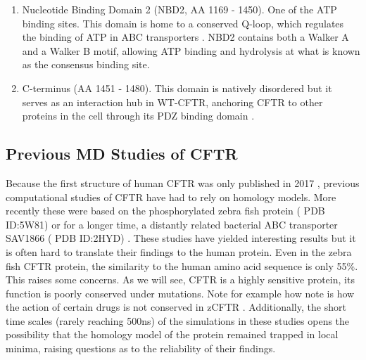 \begin{enumerate}
	\item Nucleotide Binding Domain 2 (NBD2, AA 1169 - 1450). One of the ATP binding sites. This domain is home to a conserved Q-loop, which regulates the binding of ATP in ABC transporters \cite{ivey2020, zolnerciks2014, dong2015}. NBD2 contains both a Walker A and a Walker B motif, allowing ATP binding and hydrolysis at what is known as the consensus binding site. 
	\item C-terminus (AA 1451 - 1480). This domain is natively disordered but it serves as an interaction hub in WT-CFTR, anchoring CFTR to other proteins in the cell through its PDZ binding domain \cite{moyer1999, cushing2008}. 

\end{enumerate}



\subsection {Previous MD Studies of CFTR}
Because the first structure of human CFTR was only published in 2017 \cite{liu2017}, previous computational studies of CFTR have had to rely on homology models. More recently these were based on the phosphorylated zebra fish protein ( PDB ID:5W81) \cite{zhang2017a} or for a longer time, a distantly related bacterial ABC transporter SAV1866 ( PDB ID:2HYD) \cite{dawson2006, Hoffmann2018}. These studies have yielded interesting results but it is often hard to translate their findings to the human protein. Even in the zebra fish CFTR protein, the similarity to the human amino acid sequence is only 55\%. This raises some concerns. As we will see, CFTR is a highly sensitive protein, its function is poorly conserved under mutations. Note for example how note is how the action of certain drugs is not conserved in zCFTR \cite{laselva2019}. Additionally, the short time scales (rarely reaching 500ns) of the simulations in these studies opens the possibility that the homology model of the protein remained trapped in local minima, raising questions as to the reliability of their findings.  

